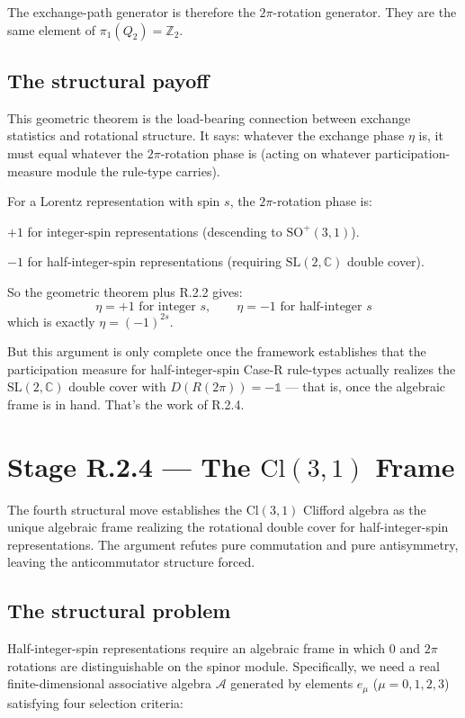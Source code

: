 \documentclass[11pt,a4paper]{article}
\begin{document}
The exchange-path generator is therefore the $2\pi$-rotation generator. They are the same element of $\pi_1(Q_2) = \mathbb{Z}_2$.

\subsection{The structural payoff}

This geometric theorem is the load-bearing connection between exchange statistics and rotational structure. It says: whatever the exchange phase $\eta$ is, it must equal whatever the $2\pi$-rotation phase is (acting on whatever participation-measure module the rule-type carries).

For a Lorentz representation with spin $s$, the $2\pi$-rotation phase is:

$+1$ for integer-spin representations (descending to $\mathrm{SO}^+(3,1)$).

$-1$ for half-integer-spin representations (requiring $\mathrm{SL}(2,\mathbb{C})$ double cover).

So the geometric theorem plus R.2.2 gives:
\[
\eta = +1 \text{ for integer } s, \qquad \eta = -1 \text{ for half-integer } s
\]
which is exactly $\eta = (-1)^{2s}$.

But this argument is only complete once the framework establishes that the participation measure for half-integer-spin Case-R rule-types actually realizes the $\mathrm{SL}(2,\mathbb{C})$ double cover with $D(R(2\pi)) = -\mathbb{1}$ --- that is, once the algebraic frame is in hand. That's the work of R.2.4.

\section{Stage R.2.4 --- The $\mathrm{Cl}(3,1)$ Frame}

The fourth structural move establishes the $\mathrm{Cl}(3,1)$ Clifford algebra as the unique algebraic frame realizing the rotational double cover for half-integer-spin representations. The argument refutes pure commutation and pure antisymmetry, leaving the anticommutator structure forced.

\subsection{The structural problem}

Half-integer-spin representations require an algebraic frame in which $0$ and $2\pi$ rotations are distinguishable on the spinor module. Specifically, we need a real finite-dimensional associative algebra $\mathcal{A}$ generated by elements $e_\mu$ ($\mu = 0, 1, 2, 3$) satisfying four selection criteria:
\end{document}
